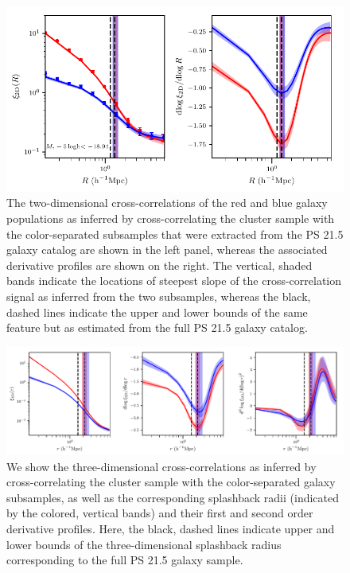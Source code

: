 \documentclass[iop, apjl, twocolappendix, numberedappendix]{emulateapj}
\begin{document}
\begin{figure}
    \includegraphics[scale=0.65]{color_separated_2D_with_spline_no_mc.pdf}
\caption{The two-dimensional cross-correlations
of the red and blue galaxy populations as inferred by
cross-correlating the cluster sample with the color-separated
subsamples that were extracted from the PS 21.5 galaxy catalog are
shown in the left panel, whereas the associated derivative profiles
are shown on the right. The vertical, shaded bands indicate the
locations of steepest slope of the cross-correlation signal as
inferred from the two subsamples, whereas the black, dashed lines
indicate the upper and lower bounds of the same feature but as
estimated from the full PS 21.5 galaxy catalog. }
   \label{fig:color_curve_2D} 
\end{figure}
\begin{figure}
    \includegraphics[scale=0.75]{color_separated_3D_with_spline_no_mc.pdf}
\caption{We show the three-dimensional cross-correlations as
inferred by cross-correlating the cluster sample with the
color-separated galaxy subsamples, as well as the corresponding
splashback radii (indicated by the colored, vertical bands) and
their first and second order derivative profiles. Here, the black, dashed lines indicate
upper and lower bounds of the three-dimensional splashback radius
corresponding to the full PS 21.5 galaxy sample.}
   \label{fig:color_curve_3D} 
\end{figure}
\end{document}
